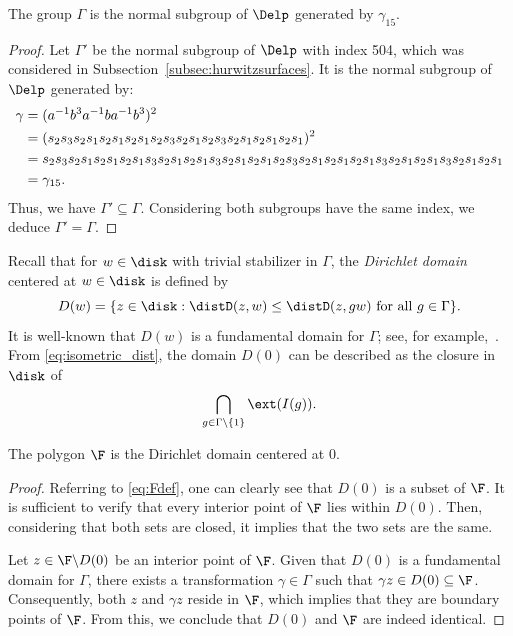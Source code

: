 \begin{cor}
The group $\Gamma$ is the normal subgroup of $\Delp$ generated by $\gamma_{15}$.
\end{cor}
\begin{proof}
Let $\Gamma'$ be the normal subgroup of $\Delp$ with index 504, which was considered in Subsection~\ref{subsec:hurwitzsurfaces}.
It is the normal subgroup of $\Delp$ generated by:
\begin{align}
\gamma & = (a^{-1}b^3a^{-1}ba^{-1}b^3)^2 \notag \\
& = (s_2s_3s_2s_1s_2s_1s_2s_1s_2s_3s_2s_1s_2s_3s_2s_1s_2s_1s_2s_1)^2 \notag \\
&= s_2s_3s_2s_1s_2s_1s_2s_1s_3s_2s_1s_2s_1s_3s_2s_1s_2s_1s_2s_3s_2s_1s_2s_1s_2s_1s_3s_2s_1s_2s_1s_3s_2s_1s_2s_1 \notag \\
&= \gamma_{15}. \label{eq:gamma15}
\end{align}
Thus, we have $\Gamma' \subseteq \Gamma$.
Considering both subgroups have the same index, we deduce \( \Gamma' = \Gamma \).
\end{proof}

Recall that for $w\in \disk$ with trivial stabilizer in $\Gamma$, the \textit{Dirichlet domain} centered at $w\in \disk$ is defined by
\[
D(w)=\{z \in \disk: \distD(z, w) \leq \distD(z, g w) \text { for all } g \in \Gamma\} .
\]
It is well-known that $D(w)$ is a fundamental domain for $\Gamma$; see, for example,~\cite[Section 9.4]{MR0698777}.
From \eqref{eq:isometric_dist}, the domain $D(0)$ can be described as the closure in $\disk$ of 
\[
\bigcap_{g \in \Gamma \backslash\{1\}} \ext(I(g)).
\]

\begin{thm}\label{thm:dirichlet}
The polygon $\F$ is the Dirichlet domain centered at $0$.    
\end{thm}
\begin{proof}
Referring to \eqref{eq:Fdef}, one can clearly see that \(D(0)\) is a subset of \(\F\). 
It is sufficient to verify that every interior point of \(\F\) lies within \(D(0)\). 
Then, considering that both sets are closed, it implies that the two sets are the same.

Let $z\in \F\backslash D(0)$ be an interior point of $\F$.
Given that $D(0)$ is a fundamental domain for $\Gamma$, there exists a transformation $\gamma\in \Gamma$ such that $\gamma z\in D(0)\subseteq \F$.
Consequently, both \(z\) and \(\gamma z\) reside in \(\F\), which implies that they are boundary points of $\F$.
From this, we conclude that \(D(0)\) and \(\F\) are indeed identical.
\end{proof}


